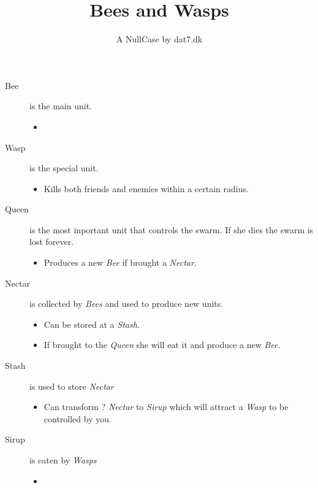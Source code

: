\documentclass[article,11pt,a4paper]{memoir}
\title{Bees and Wasps}
\author{A NullCase by dat7.dk}
\newcommand{\n}[1]{\textit{#1}}
\begin{document}
\maketitle
\newpage

\begin{description}
	\item[Bee] is the main unit.
		\begin{itemize}
			\item 
		\end{itemize}
	\item[Wasp] is the special unit.
		\begin{itemize}
			\item Kills both friends and enemies within a certain radius.
		\end{itemize}
	\item[Queen] is the most inportant unit that controls the swarm. If she
		dies the swarm is lost forever.
		\begin{itemize}
			\item Produces a new \n{Bee} if brought a \n{Nectar}.
		\end{itemize}
	\item[Nectar] is collected by \n{Bees} and used to produce new units.
		\begin{itemize}
			\item Can be stored at a \n{Stash}.
			\item If brought to the \n{Queen} she will eat it and produce a new
				\n{Bee}.
		\end{itemize}
	\item[Stash] is used to store \n{Nectar}
		\begin{itemize}
			\item Can transform ? \n{Nectar} to \n{Sirup} which will attract a 
				\n{Wasp} to be controlled by you.
		\end{itemize}
	\item[Sirup] is eaten by \n{Wasps}
		\begin{itemize}
			\item 
		\end{itemize}
\end{description}
\end{document}
